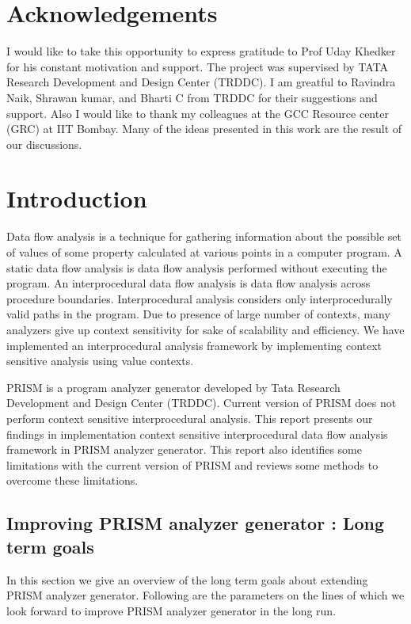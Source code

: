 \documentclass[12pt]{report}
\begin{document}
\newpage
\chapter*{Acknowledgements}

I would like to take this opportunity to express gratitude to Prof Uday Khedker for his constant motivation and support. The project was supervised by TATA Research Development and Design Center (TRDDC). I am greatful to Ravindra Naik, Shrawan kumar, and Bharti C from TRDDC for their suggestions and support. Also I would like to thank my colleagues at the GCC Resource center (GRC) at IIT Bombay. Many of the ideas presented in this work are the result of our discussions.

\newpage
\tableofcontents 
{}
\newpage
\chapter{Introduction}

Data flow analysis \cite{dfa} is a technique for gathering information about the possible set of values of some property calculated at various points in a computer program. A static data flow analysis is data flow analysis performed without executing the program. An interprocedural data flow analysis is data flow analysis across procedure boundaries. Interprocedural analysis considers only interprocedurally valid paths in the program. Due to presence of large number of contexts, many analyzers give up context sensitivity for sake of scalability and efficiency. We have implemented an interprocedural analysis framework by implementing context sensitive analysis using value contexts.

PRISM is a program analyzer generator developed by Tata Research Development and Design Center (TRDDC). Current version of PRISM does not perform context sensitive interprocedural analysis. This report presents our findings in implementation context sensitive interprocedural data flow analysis framework in PRISM analyzer generator. This report also identifies some limitations with the current version of PRISM and reviews some methods to overcome these limitations.



\section{Improving PRISM analyzer generator : Long term goals}

In this section we give an overview of the long term goals about extending PRISM analyzer generator. Following are the parameters on the lines of which we look forward to improve PRISM analyzer generator in the long run. 
\end{document}
